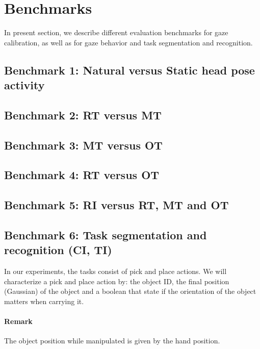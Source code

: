 \documentclass[11pt,a4paper]{article}
\begin{document}
\section{Benchmarks}
\label{Benchmarks}
In present section, we describe different evaluation benchmarks for gaze calibration, as well as for gaze behavior and task segmentation and recognition.
\subsection{Benchmark 1: Natural versus Static head pose activity}
\subsection{Benchmark 2: RT versus MT} 
\subsection{Benchmark 3: MT versus OT}
\subsection{Benchmark 4: RT versus OT}
\subsection{Benchmark 5: RI versus RT, MT and OT}
\subsection{Benchmark 6: Task segmentation and recognition (CI, TI)}
In our experiments, the tasks consist of pick and place actions. We will characterize a pick and place action by: the object ID, the final position (Gaussian) of the object and a boolean that state if the orientation of the object matters when carrying it.
\paragraph{Remark} The object position while manipulated is given by the hand position.

\clearpage


\end{document}
